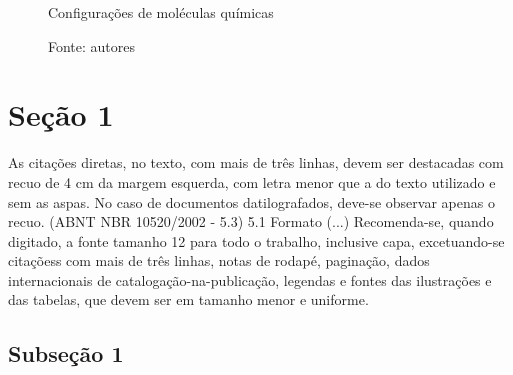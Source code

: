 \documentclass[12pt,openright,twoside,a4paper]{abntex2}
\begin{document}
\lipsum[5]


\begin{figure}[htb]
	\begin{center}
		\makevisible
		\begin{rxn}
		\end{rxn}
	
	    \caption{\label{fig_aromaticos}Configurações de moléculas químicas}
	    \caption*{Fonte: autores}
	\end{center}
\end{figure}

\lipsum[6]


\section{Seção 1}

\lipsum[7]

\begin{citacao}
As citações diretas, no texto, com mais de três linhas, devem ser
destacadas com recuo de 4 cm da margem esquerda, com letra menor que a do texto
utilizado e sem as aspas. No caso de documentos datilografados, deve-se
observar apenas o recuo. (ABNT NBR 10520/2002 - 5.3) 5.1 Formato
(...)
Recomenda-se, quando digitado, a fonte tamanho 12 para todo o trabalho,
inclusive capa, excetuando-se citaçõess com mais de três linhas, notas de
rodapé, paginação, dados internacionais de catalogação-na-publicação,
legendas e fontes das ilustrações e das tabelas, que devem ser em tamanho menor
e uniforme.
\end{citacao}

\subsection{Subseção 1}
\end{document}
